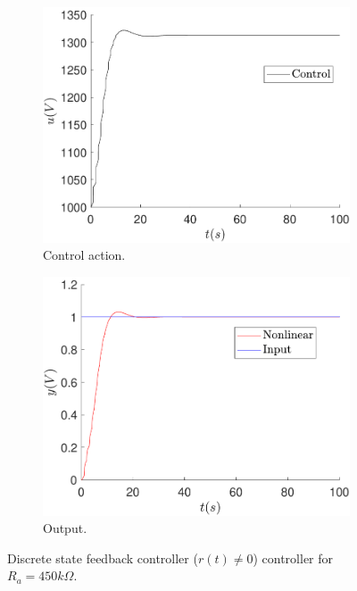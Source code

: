 	\begin{figure}
        \centering
        \begin{subfigure}[b]{0.475\textwidth}
            \centering
            \includegraphics[scale=0.425]{files/sens_analysis/Ref!0/control_analysis_sfc_a_450_ref_dif_0.pdf}
            \caption{Control action.}
        \end{subfigure}
        \vskip0.1cm
        \begin{subfigure}[b]{0.475\textwidth}   
            \centering 
            \includegraphics[scale=0.425]{files/sens_analysis/Ref!0/analysis_sfc_a_450_ref_dif_0.pdf}
            \caption{Output.}
        \end{subfigure}
        \caption{Discrete state feedback controller ($r(t)\neq0$) controller for $R_a=450k\Omega$.}
        \label{fig:sens_ra_450_state_noess}
	\end{figure}
	
